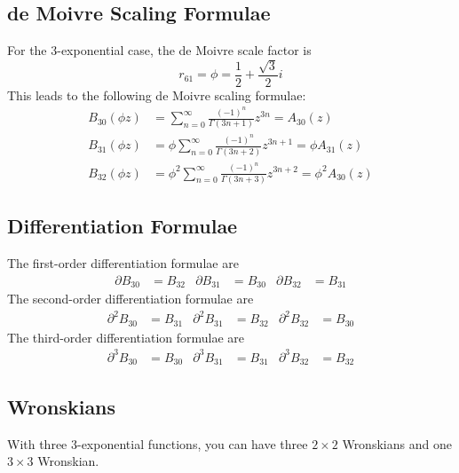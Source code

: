\subsection{de Moivre Scaling Formulae}
For the 3-exponential case, the de Moivre scale factor is
\begin{equation}
    r_{61} = \phi = \frac{1}{2} + \frac{\sqrt{3}}{2}i
\end{equation}
This leads to the following de Moivre scaling formulae:
\begin{align}
    B_{30}(\phi z) &= \sum_{n = 0}^{\infty} \frac{(-1)^{n}}{\Gamma\left(3n + 1\right)} z^{3n} = A_{30}(z) \\
    B_{31}(\phi z) &= \phi \sum_{n = 0}^{\infty} \frac{(-1)^{n}}{\Gamma\left(3n + 2\right)} z^{3n+1} = \phi A_{31}(z) \\
    B_{32}(\phi z) &= \phi^{2} \sum_{n = 0}^{\infty} \frac{(-1)^{n}}{\Gamma\left(3n + 3\right)} z^{3n+2} = \phi^{2} A_{30}(z)
\end{align}
\subsection{Differentiation Formulae}
The first-order differentiation formulae are
\begin{align}
    \partial B_{30} &= B_{32} & \partial B_{31} &= B_{30} & \partial B_{32} &= B_{31}
\end{align}
The second-order differentiation formulae are
\begin{align}
    \partial^{2} B_{30} &= B_{31} & \partial^{2} B_{31} &= B_{32} & \partial^{2} B_{32} &= B_{30}
\end{align}
The third-order differentiation formulae are
\begin{align}
    \partial^{3} B_{30} &= B_{30} & \partial^{3} B_{31} &= B_{31} & \partial^{3} B_{32} &= B_{32}
\end{align}
\subsection{Wronskians}
With three 3-exponential functions, you can have three $2 \times 2$ Wronskians and one $3 \times 3$ Wronskian.

